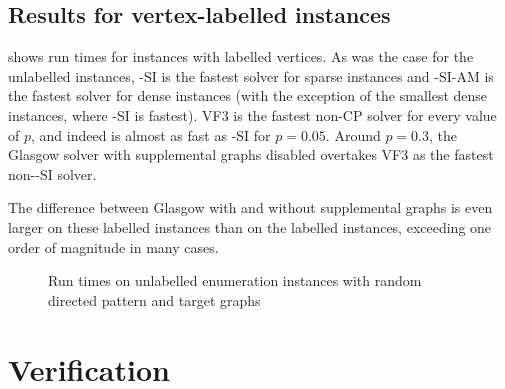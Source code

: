 \FloatBarrier

\subsection{Results for vertex-labelled instances}

 shows run times for instances with labelled vertices.
As was the case for the unlabelled instances, \McSplit-SI is the fastest solver for sparse instances and \McSplit-SI-AM
is the fastest solver for dense instances (with the exception of the smallest dense instances,
where \McSplit-SI is fastest).  VF3 is the fastest non-CP solver for every value of $p$, and indeed is almost
as fast as \McSplit-SI for $p=0.05$.  Around $p=0.3$, the Glasgow solver
with supplemental graphs disabled overtakes VF3 as the fastest non-\McSplit-SI solver.

The difference between Glasgow with and without supplemental graphs is even larger on these labelled instances
than on the labelled instances, exceeding one order of magnitude in many cases.

\begin{figure}[h!]
    \centering
    \caption{Run times on unlabelled enumeration instances with random directed pattern and target graphs}
    \label{figure:labelled-vf-instance-runtimes}
\end{figure}

\FloatBarrier

\section{Verification}

